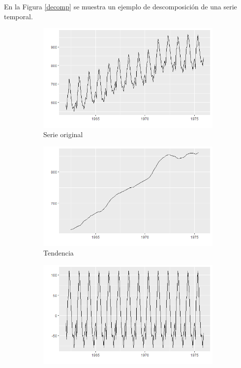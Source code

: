 En la Figura \ref{decomp} se muestra un ejemplo de descomposición de una serie temporal.
\begin{figure} [t]
\begin{subfigure}{.5\textwidth}
  \centering
  \includegraphics[width=.8\linewidth]{Images/Conceptos/serie.png}
  \caption{Serie original}
  \label{fig:sfig1}
\end{subfigure}
\begin{subfigure}{.5\textwidth}
  \centering
  \includegraphics[width=.8\linewidth]{Images/Conceptos/tend.png}
  \caption{Tendencia}
  \label{fig:sfig2}
\end{subfigure}
\begin{subfigure}{.5\textwidth}
  \centering
  \includegraphics[width=.8\linewidth]{Images/Conceptos/season.png}

\end{subfigure}
\end{figure}
